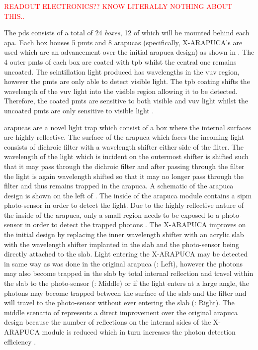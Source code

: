\textcolor{red}{READOUT ELECTRONICS?? KNOW LITERALLY NOTHING ABOUT THIS..}

The \gls{pds} consists of a total of 24 \textit{boxes}, 12 of which will be mounted behind each \gls{apa}. Each box houses 5 \glspl{pmt} and 8 \glspl{arapuca} (specifically, X-ARAPUCA's are used which are an advancement over the initial \gls{arapuca} design) as shown in . The 4 outer \glspl{pmt} of each box are coated with \gls{tpb} whilst the central one remains uncoated. The scintillation light produced has wavelengths in the \gls{vuv} region, however the \glspl{pmt} are only able to detect visible light. The \gls{tpb} coating shifts the wavelength of the \gls{vuv} light into the visible region allowing it to be detected. Therefore, the coated \glspl{pmt} are sensitive to both visible and \gls{vuv} light whilst the uncoated \glspl{pmt} are only sensitive to visible light \cite{LArTPC_review}. 

\glspl{arapuca} are a novel light trap which consist of a box where the internal surfaces are highly reflective. The surface of the \gls{arapuca} which faces the incoming light consists of dichroic filter with a wavelength shifter either side of the filter. The wavelength of the light which is incident on the outermost shifter is shifted such that it may pass through the dichroic filter and after passing through the filter the light is again wavelength shifted so that it may no longer pass through the filter and thus remains trapped in the \gls{arapuca}. A schematic of the \gls{arapuca} design is shown on the left of . The inside of the \gls{arapuca} module contains a \gls{sipm} photo-sensor in order to detect the light. Due to the highly reflective nature of the inside of the \gls{arapuca}, only a small region needs to be exposed to a photo-sensor in order to detect the trapped photons \cite{ARAPUCA}. The X-ARAPUCA improves on the initial design by replacing the inner wavelength shifter with an acrylic slab with the wavelength shifter implanted in the slab and the photo-sensor being directly attached to the slab. Light entering the X-ARAPUCA may be detected in same way as was done in the original \gls{arapuca} (: Left), however the photons may also become trapped in the slab by total internal reflection and travel within the slab to the photo-sensor (: Middle) or if the light enters at a large angle, the photons may become trapped between the surface of the slab and the filter and will travel to the photo-sensor without ever entering the slab (: Right). The middle scenario of  represents a direct improvement over the original \gls{arapuca} design because the number of reflections on the internal sides of the X-ARAPUCA module is reduced which in turn increases the photon detection efficiency \cite{X-ARAPUCA}. 

